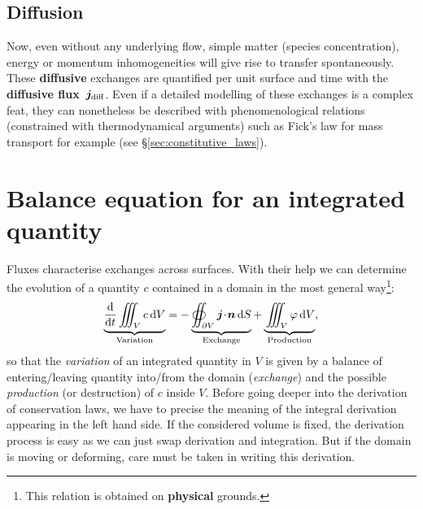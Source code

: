 \subsection{Diffusion}
Now, even without any underlying flow, simple matter (species concentration), energy or momentum inhomogeneities will give rise to transfer spontaneously. These \textbf{diffusive} exchanges are quantified per unit surface and time with the \textbf{diffusive flux}~$\bj_\text{diff}$. 
Even if a detailed modelling of these exchanges is a complex feat, they can nonetheless be described with phenomenological relations (constrained with thermodynamical arguments) such as Fick's law for mass transport for example (see \S\ref{sec:constitutive_laws}).
\section{Balance equation for an integrated quantity}
Fluxes characterise exchanges across surfaces. With their help we can determine the evolution of a quantity $c$ contained in a domain in the most general way\footnote{This relation is obtained on \textbf{physical} grounds.}:
\begin{equation}
\underbrace{\vphantom{\oiint_{\partial V}}\dd{}{t}\iiint_{V}c\, \dV}_\text{Variation} = -\underbrace{\oiint_{\partial V} \bj\!\cdot\!\bn\,\dS}_\text{Exchange} + \underbrace{\vphantom{\oiint_{\partial V}}\iiint_{V} \varphi\,\dV}_\text{Production},
\label{eq:conservation_law}
\end{equation}
so that the \textit{variation} of an integrated quantity in  $V$ is given by a balance of entering/leaving quantity into/from the domain (\textit{exchange}) and the possible \textit{production} (or destruction) of $c$ inside $V$.
Before going deeper into the derivation of conservation laws, we have to precise the meaning of the integral derivation appearing in the left hand side. If the considered volume is fixed, the derivation process is easy as we can just swap derivation and integration. But if the domain is moving or deforming, care must be taken in writing this derivation.
